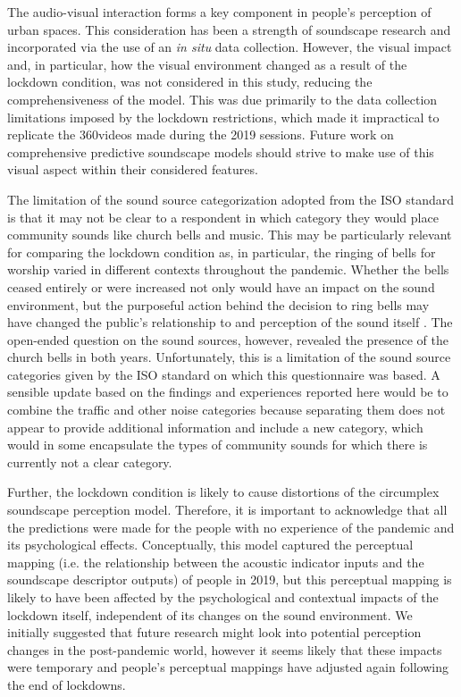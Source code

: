    The audio-visual interaction forms a key component in people's perception of urban spaces. This consideration has been a strength of soundscape research and incorporated via the use of an \emph{in situ} data collection. However, the visual impact and, in particular, how the visual environment changed as a result of the lockdown condition, was not considered in this study, reducing the comprehensiveness of the model. This was due primarily to the data collection limitations imposed by the lockdown restrictions, which made it impractical to replicate the 360\textdegree videos made during the 2019 sessions. Future work on comprehensive predictive soundscape models should strive to make use of this visual aspect within their considered features. 

   The limitation of the sound source categorization adopted from the ISO standard is that it may not be clear to a respondent in which category they would place community sounds like church bells and music. This may be particularly relevant for comparing the lockdown condition as, in particular, the ringing of bells for worship varied in different contexts throughout the pandemic. Whether the bells ceased entirely or were increased not only would have an impact on the sound environment, but the purposeful action behind the decision to ring bells may have changed the public's relationship to and perception of the sound itself \citep{Parker2020Anthropause}. The open-ended question on the sound sources, however, revealed the presence of the church bells in both years. Unfortunately, this is a limitation of the sound source categories given by the ISO standard on which this questionnaire was based. A sensible update based on the findings and experiences reported here would be to combine the traffic and other noise categories because separating them does not appear to provide additional information and include a new category, which would in some encapsulate the types of community sounds for which there is currently not a clear category.

   Further, the lockdown condition is likely to cause distortions of the circumplex soundscape perception model. Therefore, it is important to acknowledge that all the predictions were made for the people with no experience of the pandemic and its psychological effects. Conceptually, this model captured the perceptual mapping (i.e. the relationship between the acoustic indicator inputs and the soundscape descriptor outputs) of people in 2019, but this perceptual mapping is likely to have been affected by the psychological and contextual impacts of the lockdown itself, independent of its changes on the sound environment. We initially suggested that future research might look into potential perception changes in the post-pandemic world, however it seems likely that these impacts were temporary and people's perceptual mappings have adjusted again following the end of lockdowns.

